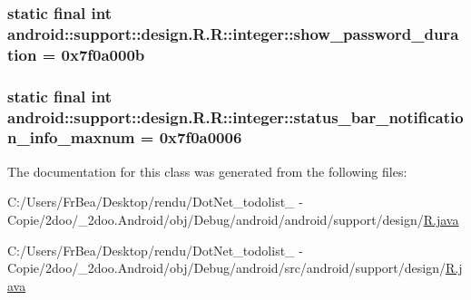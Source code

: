 \hypertarget{classandroid_1_1support_1_1design_1_1_r_1_1integer_4fb631ebf0ebb12fe276bf352edf28b8}{
\subsubsection[{show\_\-password\_\-duration}]{\setlength{\rightskip}{0pt plus 5cm}static final int android::support::design.R.R::integer::show\_\-password\_\-duration = 0x7f0a000b}}
\label{classandroid_1_1support_1_1design_1_1_r_1_1integer_4fb631ebf0ebb12fe276bf352edf28b8}


\hypertarget{classandroid_1_1support_1_1design_1_1_r_1_1integer_2de627d69de3dfede17661d6a722c76a}{
\subsubsection[{status\_\-bar\_\-notification\_\-info\_\-maxnum}]{\setlength{\rightskip}{0pt plus 5cm}static final int android::support::design.R.R::integer::status\_\-bar\_\-notification\_\-info\_\-maxnum = 0x7f0a0006}}
\label{classandroid_1_1support_1_1design_1_1_r_1_1integer_2de627d69de3dfede17661d6a722c76a}




The documentation for this class was generated from the following files:\begin{CompactItemize}
\item 
C:/Users/FrBea/Desktop/rendu/DotNet\_\-todolist\_ - Copie/2doo/\_\-2doo.Android/obj/Debug/android/android/support/design/\hyperlink{android_2support_2design_2_r_8java}{R.java}\item 
C:/Users/FrBea/Desktop/rendu/DotNet\_\-todolist\_ - Copie/2doo/\_\-2doo.Android/obj/Debug/android/src/android/support/design/\hyperlink{src_2android_2support_2design_2_r_8java}{R.java}\end{CompactItemize}
